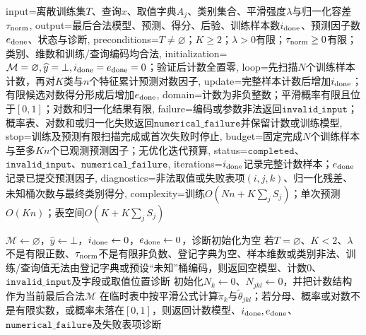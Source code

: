 \begin{AlgorithmContract}{
  input={离散训练集$T$、查询$x$、取值字典$A_j$、类别集合、平滑强度$\lambda$与归一化容差$\tau_{\rm norm}$},
  output={最后合法模型、预测、得分、后验、训练样本数$i_{\rm done}$、预测因子数$e_{\rm done}$、状态与诊断},
  preconditions={$T\ne\varnothing$；$K\ge2$；$\lambda>0$有限；$\tau_{\rm norm}\ge0$有限；类别、维数和训练/查询编码均合法},
  initialization={$\mathcal M=\varnothing,\widehat y=\bot,i_{\rm done}=e_{\rm done}=0$；验证后计数全置零},
  loop={先扫描$N$个训练样本计数，再对$K$类与$n$个特征累计预测对数因子},
  update={完整样本计数后增加$i_{\rm done}$；有限候选对数得分形成后增加$e_{\rm done}$},
  domain={计数为非负整数；平滑概率有限且位于$[0,1]$；对数和归一化结果有限},
  failure={编码或参数非法返回$\mathtt{invalid\_input}$；概率表、对数和或归一化失败返回$\mathtt{numerical\_failure}$并保留计数或训练模型},
  stop={训练及预测有限扫描完成或首次失败时停止},
  budget={固定完成$N$个训练样本与至多$Kn$个已观测预测因子；无优化迭代预算},
  status={$\mathtt{completed}$、$\mathtt{invalid\_input}$、$\mathtt{numerical\_failure}$},
  iterations={$i_{\rm done}$记录完整计数样本；$e_{\rm done}$记录已提交预测因子},
  diagnostics={非法取值或失败表项$(i,j,k)$、归一化残差、未知桶次数与最终类别得分},
  complexity={训练$O(Nn+K\sum_jS_j)$；单次预测$O(Kn)$；表空间$O(K+K\sum_jS_j)$}
}
\begin{algorithm}[H]
\caption{带对称平滑的离散朴素贝叶斯训练与分类}\label{alg:V2-C03-nb}
$\mathcal M\leftarrow\varnothing$，$\widehat y\leftarrow\bot$，$i_{\rm done}\leftarrow0$，$e_{\rm done}\leftarrow0$，诊断初始化为空\;
若$T=\varnothing$、$K<2$、$\lambda$不是有限正数、$\tau_{\rm norm}$不是有限非负数、登记字典为空、样本维数或类别非法、训练/查询值无法由登记字典或预设“未知”桶编码，则返回空模型、计数$0$、$\mathtt{invalid\_input}$及字段或取值位置诊断\;
初始化$N_k\leftarrow0$、$N_{jkl}\leftarrow0$，并把计数结构作为当前最后合法$\mathcal M$\;
在临时表中按平滑公式计算$\widetilde\pi_k$与$\widetilde\theta_{jkl}$；若分母、概率或对数不是有限实数，或概率未落在$[0,1]$，则返回计数模型、$i_{\rm done},e_{\rm done}$、$\mathtt{numerical\_failure}$及失败表项诊断\;

\end{algorithm}
\end{AlgorithmContract}
